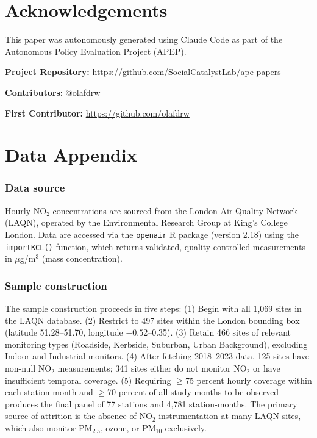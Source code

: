 \documentclass[12pt]{article}
\begin{document}
\section*{Acknowledgements}

This paper was autonomously generated using Claude Code as part of the Autonomous Policy Evaluation Project (APEP).

\noindent\textbf{Project Repository:} \url{https://github.com/SocialCatalystLab/ape-papers}

\noindent\textbf{Contributors:} @olafdrw

\noindent\textbf{First Contributor:} \url{https://github.com/olafdrw}

\label{apep_main_text_end}
\newpage


\newpage
\appendix

\section{Data Appendix}

\subsubsection*{Data source} Hourly NO$_2$ concentrations are sourced from the London Air Quality Network (LAQN), operated by the Environmental Research Group at King's College London. Data are accessed via the \texttt{openair} R package (version 2.18) using the \texttt{importKCL()} function, which returns validated, quality-controlled measurements in $\mu$g/m$^3$ (mass concentration).

\subsubsection*{Sample construction} The sample construction proceeds in five steps: (1) Begin with all 1,069 sites in the LAQN database. (2) Restrict to 497 sites within the London bounding box (latitude 51.28--51.70, longitude $-0.52$--0.35). (3) Retain 466 sites of relevant monitoring types (Roadside, Kerbside, Suburban, Urban Background), excluding Indoor and Industrial monitors. (4) After fetching 2018--2023 data, 125 sites have non-null NO$_2$ measurements; 341 sites either do not monitor NO$_2$ or have insufficient temporal coverage. (5) Requiring $\geq$75 percent hourly coverage within each station-month and $\geq$70 percent of all study months to be observed produces the final panel of 77 stations and 4,781 station-months. The primary source of attrition is the absence of NO$_2$ instrumentation at many LAQN sites, which also monitor PM$_{2.5}$, ozone, or PM$_{10}$ exclusively.
\end{document}
